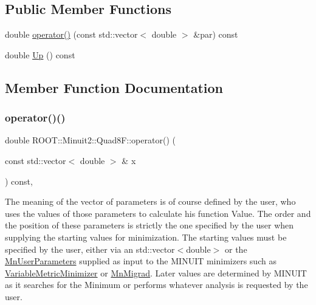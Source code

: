 \subsection*{Public Member Functions}
\begin{DoxyCompactItemize}
\item 
double \mbox{\hyperlink{classROOT_1_1Minuit2_1_1Quad8F_ade3e6d285a6c3733f9032d6e5c0c0a9b}{operator()}} (const std\+::vector$<$ double $>$ \&par) const
\item 
double \mbox{\hyperlink{classROOT_1_1Minuit2_1_1Quad8F_a8f241ff1340ea2184c7ee9247b8b200a}{Up}} () const
\end{DoxyCompactItemize}


\subsection{Member Function Documentation}
\mbox{\label{classROOT_1_1Minuit2_1_1Quad8F_ade3e6d285a6c3733f9032d6e5c0c0a9b}} 
\subsubsection{\texorpdfstring{operator()()}{operator()()}}
{\footnotesize\ttfamily double R\+O\+O\+T\+::\+Minuit2\+::\+Quad8\+F\+::operator() (\begin{DoxyParamCaption}\item[{const std\+::vector$<$ double $>$ \&}]{x }\end{DoxyParamCaption}) const\hspace{0.3cm}{\ttfamily [inline]}, {\ttfamily [virtual]}}

The meaning of the vector of parameters is of course defined by the user, who uses the values of those parameters to calculate his function Value. The order and the position of these parameters is strictly the one specified by the user when supplying the starting values for minimization. The starting values must be specified by the user, either via an std\+::vector$<$double$>$ or the \mbox{\hyperlink{classROOT_1_1Minuit2_1_1MnUserParameters}{Mn\+User\+Parameters}} supplied as input to the M\+I\+N\+U\+IT minimizers such as \mbox{\hyperlink{classROOT_1_1Minuit2_1_1VariableMetricMinimizer}{Variable\+Metric\+Minimizer}} or \mbox{\hyperlink{classROOT_1_1Minuit2_1_1MnMigrad}{Mn\+Migrad}}. Later values are determined by M\+I\+N\+U\+IT as it searches for the Minimum or performs whatever analysis is requested by the user.


